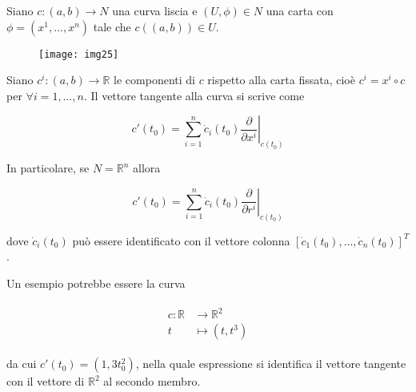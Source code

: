 \begin{definition}\label{loc-exp-tan-cur}
	Siano $ c : (a,b) \to N $ una curva liscia e $ (U,\phi) \in N $ una carta con $ \phi = (x^{1},\dots,x^{n}) $ tale che $ c((a,b)) \in U $.
	
	\begin{figure}[H]
		\centering
		\texttt{[image: img25]}
	\end{figure}
	
	Siano $ c^{i} : (a,b) \to \mathbb{R} $ le componenti di $ c $ rispetto alla carta fissata, cioè $ c^{i} = x^{i} \circ c $ per $ \forall i=1,\dots,n $. Il vettore tangente alla curva si scrive come
	
	\begin{equation}
		c'(t_{0}) = \sum_{i=1}^{n} \dot{c}_{i}(t_{0}) \left. \dfrac{\partial}{\partial x^{i}} \right|_{c(t_{0})}
	\end{equation}

	In particolare, se $ N = \mathbb{R}^{n} $ allora
	
	\begin{equation}
		c'(t_{0}) = \sum_{i=1}^{n} \dot{c}_{i}(t_{0}) \left. \dfrac{\partial}{\partial r^{i}} \right|_{c(t_{0})}
	\end{equation}

	dove $ \dot{c}_{i}(t_{0}) $ può essere identificato con il vettore colonna $ [\dot{c}_{1}(t_{0}),\dots,\dot{c}_{n}(t_{0})]^{T} $.
\end{definition}

Un esempio potrebbe essere la curva

\begin{align}
	\begin{split}
		c : \mathbb{R} &\to \mathbb{R}^{2}\\
		t &\mapsto (t,t^{3})
	\end{split}
\end{align}

da cui $ c'(t_{0}) = (1, 3 t_{0}^{2}) $, nella quale espressione si identifica il vettore tangente con il vettore di $ \mathbb{R}^{2} $ al secondo membro.

